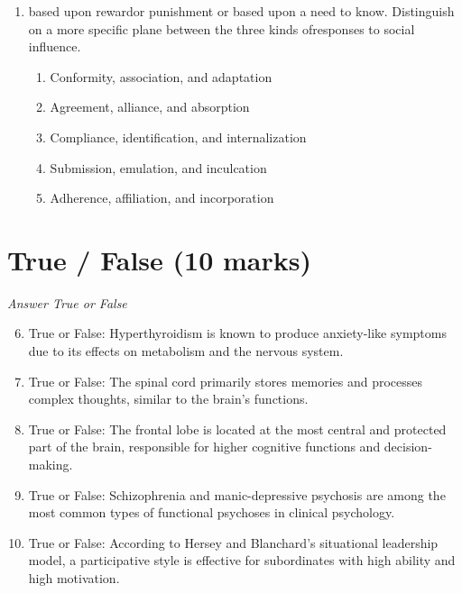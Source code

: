 \documentclass[12pt]{article}
\begin{document}
\begin{enumerate}[label=\arabic*.]
\begin{enumerate}[label=(\alph*)]
    \item gender identity
    \item gender neutrality
    \item gender assimilation
    \item gender fluidity
    \item gender affirmation
\end{enumerate}
\item based upon rewardor punishment or based upon a need to know. Distinguish on a more specific plane between the three kinds ofresponses to social influence.
\begin{enumerate}[label=(\alph*)]
    \item Conformity, association, and adaptation
    \item Agreement, alliance, and absorption
    \item Compliance, identification, and internalization
    \item Submission, emulation, and inculcation
    \item Adherence, affiliation, and incorporation
\end{enumerate}
\end{enumerate}

\section*{True / False (10 marks)}
\textit{Answer True or False}
\begin{enumerate}[label=\arabic*.]
\setcounter{enumi}{5}
\item True or False: Hyperthyroidism is known to produce anxiety-like symptoms due to its effects on metabolism and the nervous system.
\item True or False: The spinal cord primarily stores memories and processes complex thoughts, similar to the brain's functions.
\item True or False: The frontal lobe is located at the most central and protected part of the brain, responsible for higher cognitive functions and decision-making.
\item True or False: Schizophrenia and manic-depressive psychosis are among the most common types of functional psychoses in clinical psychology.
\item True or False: According to Hersey and Blanchard's situational leadership model, a participative style is effective for subordinates with high ability and high motivation.
\end{enumerate}
\end{document}
